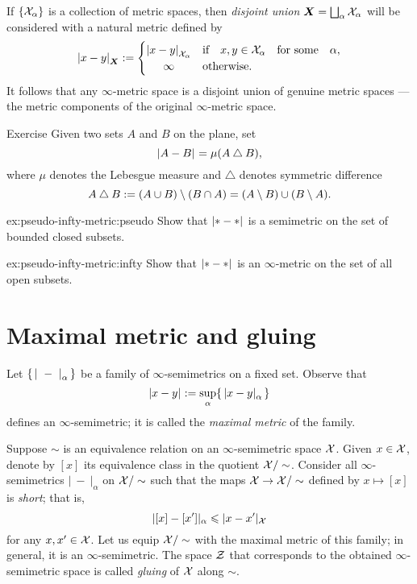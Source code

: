If $\{\mathcal{X}_\alpha\}$ is a collection of metric spaces, then \emph{disjoint union} $\bm{X}\z=\bigsqcup_\alpha\spc{X}_\alpha$ will be considered with a natural metric defined by
\[\dist{x}{y}{\bm{X}}
\df
\begin{cases}
\dist{x}{y}{\spc{X}_\alpha}&\text{if}\quad x,y\in \spc{X}_\alpha\quad\text{for some}\quad \alpha,
\\
\hfil \infty&\text{otherwise.}
\end{cases}
\]
It follows that any $\infty$-metric space is a disjoint union of genuine metric spaces --- the metric components of the original $\infty$-metric space.

\begin{thm}{Exercise}\label{ex:pseudo-infty-metric}
Given two sets $A$ and $B$ on the plane, set 
\[\dist{A}{B}{}=\mu(A\bigtriangleup B),\]
where $\mu$ denotes the Lebesgue measure and $\bigtriangleup$ denotes symmetric difference
\[A\bigtriangleup B
\mathrel{:=}(A\cup B)\setminus(B\cap A)
=(A\setminus B)\cup(B\setminus A).\]

\begin{subthm}{ex:pseudo-infty-metric:pseudo}
Show that $\dist{*}{*}{}$ is a semimetric on the set of bounded closed subsets.
\end{subthm}

\begin{subthm}{ex:pseudo-infty-metric:infty}
Show that $\dist{*}{*}{}$ is an $\infty$-metric on the set of all open subsets.
\end{subthm}
\end{thm}

\section{Maximal metric and gluing}
\label{sec:max+glue}

Let $\{\,\dist{\ }{\ }{\alpha}\,\}$ be a family of $\infty$-semimetrics on a fixed set.
Observe that
\[\dist{x}{y}{}\df\sup_\alpha\{\,\dist{x}{y}{\alpha}\,\}\]
defines an $\infty$-semimetric; it is called the \emph{maximal metric} of the family.

Suppose $\sim$ is an equivalence relation on an $\infty$-semimetric space $\mathcal{X}$.
Given $x\in\mathcal{X}$, 
denote by $[x]$ its equivalence class in the quotient $\mathcal{X}/\sim$.
Consider all $\infty$-semimetrics $|\ -\ |_\alpha$ on $\mathcal{X}/\sim$ such that the maps $\mathcal{X}\to \mathcal{X}/\sim$ defined by $x\mapsto [x]$ is \emph{short};
that is,
\[|[x]-[x']|_\alpha\leqslant |x-x'|_{\mathcal{X}}\]
for any $x,x'\in \mathcal{X}$.
Let us equip $\mathcal{X}/\sim$ with the maximal metric of this family; in general, it is an $\infty$-semimetric.
The space $\mathcal{Z}$ that corresponds to the obtained $\infty$-semimetric space is called \emph{gluing} of $\mathcal{X}$ along $\sim$.

